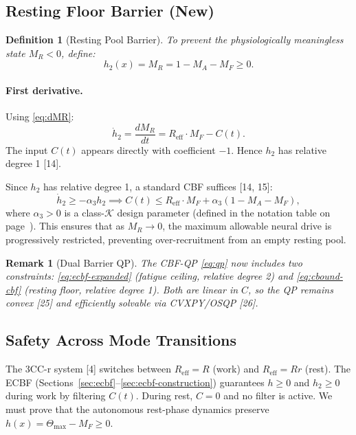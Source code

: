 \documentclass[11pt,a4paper]{article}
\newtheorem{definition}[theorem]{Definition}
\newtheorem{remark}[theorem]{Remark}
\begin{document}
\subsection{Resting Floor Barrier (New)}

\begin{definition}[Resting Pool Barrier]
To prevent the physiologically meaningless state $M_R < 0$, define:
\begin{equation}\label{eq:h2}
h_2(x) = M_R = 1 - M_A - M_F \geq 0.
\end{equation}
\end{definition}

\paragraph{First derivative.} Using \eqref{eq:dMR}:
\begin{equation}\label{eq:h2dot}
\dot h_2 = \frac{dM_R}{dt} = R_{\mathrm{eff}} \cdot M_F - C(t).
\end{equation}
The input $C(t)$ appears directly with coefficient $-1$. Hence $h_2$
has relative degree 1 [14].

Since $h_2$ has relative degree 1, a standard CBF suffices [14, 15]:
\begin{equation}\label{eq:cbound-cbf}
\dot h_2 \geq -\alpha_3 h_2 \implies C(t) \leq R_{\mathrm{eff}} \cdot M_F + \alpha_3(1 - M_A - M_F),
\end{equation}
where $\alpha_3 > 0$ is a class-$\mathcal{K}$ design parameter (defined in the notation table on page~\pageref{tab:notation}).
This ensures that as $M_R \to 0$, the maximum allowable neural drive
is progressively restricted, preventing over-recruitment from an empty
resting pool.

\begin{remark}[Dual Barrier QP]
The CBF-QP \eqref{eq:qp} now includes two constraints:
\eqref{eq:ecbf-expanded} (fatigue ceiling, relative degree 2) and
\eqref{eq:cbound-cbf} (resting floor, relative degree 1). Both are
linear in $C$, so the QP remains convex [25] and efficiently solvable
via CVXPY/OSQP [26].
\end{remark}

\subsection{Safety Across Mode Transitions}\label{sec:mode-transitions}

The 3CC-r system [4] switches between $R_{\mathrm{eff}} = R$ (work) and
$R_{\mathrm{eff}} = Rr$ (rest). The ECBF
(Sections~\ref{sec:ecbf}--\ref{sec:ecbf-construction}) guarantees $h
\geq 0$ and $h_2 \geq 0$ during work by filtering $C(t)$. During
rest, $C = 0$ and no filter is active. We must prove that the
autonomous rest-phase dynamics preserve $h(x) = \Theta_{\max} - M_F
\geq 0$.
\end{document}
